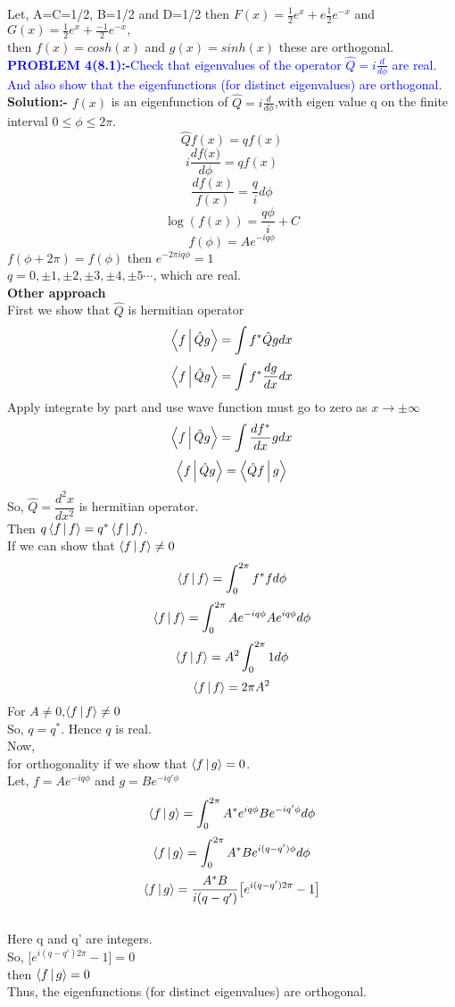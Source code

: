 Let, A=C=1/2, B=1/2 and D=1/2 then $F(x)=\frac{1}{2}e^x+e\frac{1}{2}e^{-x}$ and $G(x)=\frac{1}{2}e^x+\frac{-1}{2}e^{-x},$\\
then $f(x)=cosh(x)$ and $g(x)=sinh(x)$
these are orthogonal.
\newpage
\textcolor{blue}{ \textbf{PROBLEM 4(8.1):-}Check that eigenvalues of the  operator $\hat{Q}=i\frac{d}{d\phi}$ are real. And also show that the eigenfunctions (for distinct eigenvalues) are orthogonal.}\\
\textbf{Solution:-} $f(x)$  is an eigenfunction of $\hat{Q}=i\frac{d}{d\phi}$,with eigen value q on the finite interval $0 \leq \phi\leq 2\pi$.\\
$$\hat{Q}f(x)=qf(x)$$
$$i\frac{d{f(x})}{d\phi}=qf(x)$$
$$\frac{d{f(x)}}{f(x)}=\frac{q}{i}d\phi$$
$$\log(f(x))=\frac{q\phi}{i}+C$$
$$f(\phi)=Ae^{-iq\phi}$$
 $f(\phi+2\pi)=f(\phi)$ then $e^{-2{\pi}iq\phi}=1$\\
 $q=0,\pm{1},\pm{2},\pm{3},\pm{4},\pm{5}\cdots$, which are real.\\
 \textbf{Other approach}\\
 First we show that $\hat{Q}$ is hermitian operator\\
$$\Braket{f|\hat{Q}g}=\int{f^{*}\hat{Q}gdx}$$
$$\Braket{f|\hat{Q}g}=\int{f^{*}\frac{d{g}}{dx}dx}$$
Apply integrate by part and use wave function must go to zero as $x\rightarrow{\pm\infty}$
$$\Braket{f|\hat{Q}g}=\int{\frac{d{f^{*}}}{dx}{g}dx}$$
$$\Braket{f|\hat{Q}g}=\Braket{\hat{Q}f|g}$$
So, $\hat{Q}=\dfrac{d^2x}{dx^2}$ is hermitian operator.\\

 Then $q\Braket{f|f}=q^{*}\Braket{f|f}$.\\
 If we can show that $\Braket{f|f}\neq {0}$\\
 $$\Braket{f|f}=\int_{0}^{2\pi}f^{*}f{d\phi} $$
 $$\Braket{f|f}=\int_{0}^{2\pi}Ae^{-iq\phi}Ae^{iq\phi}{d\phi} $$
  $$\Braket{f|f}=A^{2}\int_{0}^{2\pi}{1}{d\phi} $$
  $$\Braket{f|f}=2{\pi}A^{2}$$
  For $A\neq {0}$,$\Braket{f|f}\neq {0}$\\
  So, $q=q^{*}$. Hence $q$ is real.\\ 
  Now,\\ 
  for orthogonality if we show that $\Braket{f|g}=0$.\\
  Let, $f=Ae^{-iq\phi}$ and $g=Be^{-iq'\phi}$\\
  $$\Braket{f|g}=\int_{0}^{2\pi}A^{*}e^{iq\phi}Be^{-iq'\phi}{d\phi} $$
  $$\Braket{f|g}=\int_{0}^{2\pi}A^{*}Be^{i(q-q')\phi}{d\phi} $$
  $$\Braket{f|g}=\frac{A^{*}B}{i(q-q')}\big[e^{i(q-q')2\pi}-1 \big]$$\\
  Here q and q' are integers.\\ So, $\big[e^{i(q-q')2\pi}-1 \big]=0$ \\
  then $\Braket{f|g}=0$\\
  Thus, the eigenfunctions (for distinct eigenvalues) are orthogonal.\\
  
